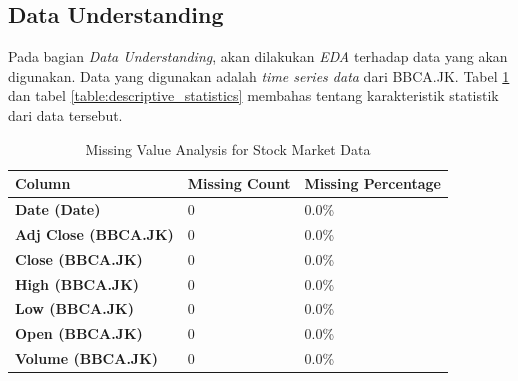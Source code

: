 \subsection{Data Understanding}

Pada bagian \textit{Data Understanding}, akan dilakukan \textit{EDA} terhadap data yang akan digunakan. Data yang digunakan adalah \textit{time series data} dari BBCA.JK. Tabel \ref{table:missing_value_analysis} dan tabel \ref{table:descriptive_statistics} membahas tentang karakteristik statistik dari data tersebut.

\begin{table}[H]
\caption{Missing Value Analysis for Stock Market Data}
\label{table:missing_value_analysis}
\begin{tabular}{|p{6cm}|p{4cm}|p{4cm}|}
\hline
\textbf{Column} & \textbf{Missing Count} & \textbf{Missing Percentage} \\ \hline
\textbf{Date (Date)} & 0 & 0.0\% \\ \hline
\textbf{Adj Close (BBCA.JK)} & 0 & 0.0\% \\ \hline
\textbf{Close (BBCA.JK)} & 0 & 0.0\% \\ \hline
\textbf{High (BBCA.JK)} & 0 & 0.0\% \\ \hline
\textbf{Low (BBCA.JK)} & 0 & 0.0\% \\ \hline
\textbf{Open (BBCA.JK)} & 0 & 0.0\% \\ \hline
\textbf{Volume (BBCA.JK)} & 0 & 0.0\% \\ \hline
\end{tabular}
\end{table}

